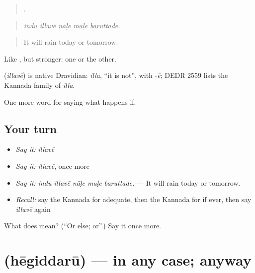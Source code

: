 \begin{quote}
    .
\end{quote}

\begin{quote}
\emph{indu illavē nāḷe maḷe baruttade.}
\end{quote}

\begin{quote}
It will rain today or tomorrow.
\end{quote}

Like , but stronger: one or the other.

\begin{cousinweb}
\textbf{} (\emph{illavē}) is native Dravidian: \emph{illa}, \textquotedblleft{}it is not\textquotedblright{}, with -\emph{ē}; DEDR 2559 lists the Kannada family of \emph{illa}.
\end{cousinweb}

\begin{grammarlens}[title={What you've built}]
One more word for saying what happens if.
\end{grammarlens}

\subsection*{Your turn}
\begin{itemize}
\raggedright
  \item \emph{Say it:} \emph{illavē}
  \item \emph{Say it:} \emph{illavē}, once more
  \item \emph{Say it:} \emph{indu illavē nāḷe maḷe baruttade.} — It will rain today or tomorrow.
  \item \emph{Recall:} say the Kannada for adequate, then the Kannada for if ever, then say \emph{illavē} again
\end{itemize}

\begin{tcolorbox}[breakable,colback=teal!4,colframe=teal!35!black,title={Before you move on}]
What does  mean? (\textquotedblleft{}Or else; or\textquotedblright{}.) Say it once more.
\end{tcolorbox}
\section[\texorpdfstring{\kn{ಹೇಗಿದ್ದರೂ} (hēgiddarū)}{ಹೇಗಿದ್ದರೂ (hēgiddarū)}]{ (hēgiddarū) — in any case; anyway}

